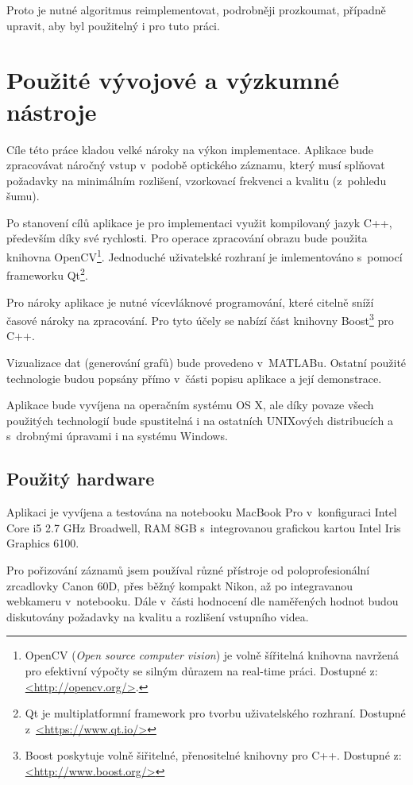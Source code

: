 \documentclass[
  digital, %
  table,   %
%
  lof,     %
  lot,     %
]{fithesis3}
\begin{document}
Proto je nutné algoritmus reimplementovat, podrobněji prozkoumat, případně upravit, aby byl použitelný i pro tuto práci. 

\chapter{Použité vývojové a výzkumné nástroje}
Cíle této práce kladou velké nároky na výkon implementace. Aplikace bude zpracovávat náročný vstup v~podobě optického záznamu, který musí splňovat požadavky na minimálním rozlišení, vzorkovací frekvenci a kvalitu (z~pohledu šumu).

Po stanovení cílů aplikace je pro implementaci využit kompilovaný jazyk C++, především díky své rychlosti. Pro operace zpracování obrazu bude použita knihovna OpenCV\footnote{OpenCV (\emph{Open source computer vision}) je volně šířitelná knihovna navržená pro efektivní výpočty se silným důrazem na real-time práci. Dostupné z: \url{<http://opencv.org/>}.}. 
Jednoduché uživatelské rozhraní je imlementováno s~pomocí frameworku Qt\footnote{Qt je multiplatformní framework pro tvorbu uživatelského rozhraní. Dostupné z~\url{<https://www.qt.io/>}}.

Pro nároky aplikace je nutné vícevláknové programování, které citelně sníží časové nároky na zpracování. Pro tyto účely se nabízí část knihovny Boost\footnote{Boost poskytuje volně šiřitelné, přenositelné knihovny pro C++. Dostupné z: \url{<http://www.boost.org/>}} 
pro C++.

Vizualizace dat (generování grafů) bude provedeno v~MATLABu. Ostatní použité technologie budou popsány přímo v~části popisu aplikace a její demonstrace.

Aplikace bude vyvíjena na operačním systému OS X, ale díky povaze všech použitých technologií bude spustitelná i na ostatních UNIXových distribucích a s~drobnými úpravami i na systému Windows.

\section{Použitý hardware}
Aplikaci je vyvíjena a testována na notebooku MacBook Pro v~konfiguraci Intel Core i5 2.7 GHz Broadwell, RAM 8GB s~integrovanou grafickou kartou Intel Iris Graphics 6100.

Pro pořizování záznamů jsem používal různé přístroje od poloprofesionální zrcadlovky Canon 60D, přes běžný kompakt Nikon, až po integravanou webkameru v~notebooku. Dále v~části hodnocení dle naměřených hodnot budou diskutovány požadavky na kvalitu a rozlišení vstupního videa.
\end{document}
